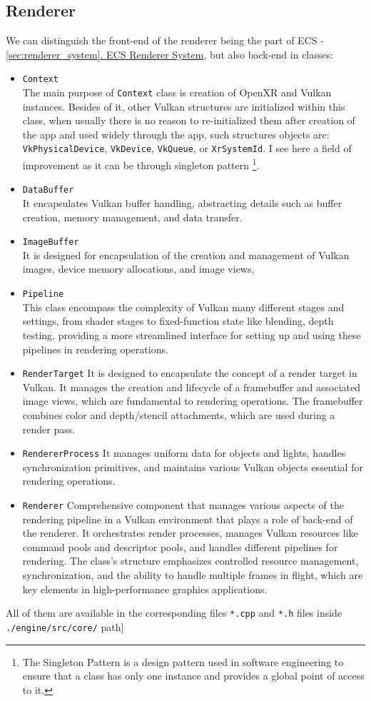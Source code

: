 \newpage
\subsection{Renderer}
\label{sec:renderer}
We can distinguish the front-end of the renderer being the part of ECS - \hyperref[sec:renderer_system]{\ref*{sec:renderer_system}. ECS Renderer System}, but also back-end in classes:
\begin{itemize}
    \item \texttt{Context}\\
    The main purpose of \texttt{Context} class is creation of OpenXR and Vulkan instances. Besides of it, other Vulkan structures are initialized within this class, when usually there is no reason to re-initialized them after creation of the app and used widely through the app, such structures objects are: \texttt{VkPhysicalDevice}, \texttt{VkDevice}, \texttt{VkQueue}, or \texttt{XrSystemId}. I see here a field of improvement as it can be through singleton pattern \footnote{The Singleton Pattern is a design pattern used in software engineering to ensure that a class has only one instance and provides a global point of access to it.}.
    \item \texttt{DataBuffer}\\
    It encapsulates Vulkan buffer handling, abstracting details such as buffer creation, memory management, and data transfer.
    \item \texttt{ImageBuffer}\\
    It is designed for encapsulation of the creation and management of Vulkan images, device memory allocations, and image views,
    \item \texttt{Pipeline}\\
    This class encompass the complexity of Vulkan many different stages and settings, from shader stages to fixed-function state like blending, depth testing, providing a more streamlined interface for setting up and using these pipelines in rendering operations. 
    \item \texttt{RenderTarget}
    It is designed to encapsulate the concept of a render target in Vulkan. It manages the creation and lifecycle of a framebuffer and associated image views, which are fundamental to rendering operations. The framebuffer combines color and depth/stencil attachments, which are used during a render pass. 
    \item \texttt{RendererProcess}
    It manages uniform data for objects and lights, handles synchronization primitives, and maintains various Vulkan objects essential for rendering operations.
    \item \texttt{Renderer}
    Comprehensive component that manages various aspects of the rendering pipeline in a Vulkan environment that plays a role of back-end of the renderer. It orchestrates render processes, manages Vulkan resources like command pools and descriptor pools, and handles different pipelines for rendering. The class's structure emphasizes controlled resource management, synchronization, and the ability to handle multiple frames in flight, which are key elements in high-performance graphics applications.
\end{itemize}
All of them are available in the corresponding files \texttt{*.cpp} and \texttt{*.h} files inside \texttt{./engine/src/core/} path]